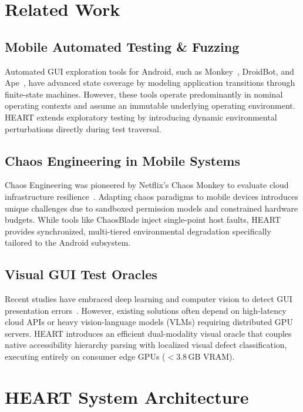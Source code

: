 \documentclass[conference]{IEEEtran}
\begin{document}
\section{Related Work}

\subsection{Mobile Automated Testing \& Fuzzing}
Automated GUI exploration tools for Android, such as Monkey~\cite{choudhary2015automated}, DroidBot, and Ape~\cite{su2017guided}, have advanced state coverage by modeling application transitions through finite-state machines. However, these tools operate predominantly in nominal operating contexts and assume an immutable underlying operating environment. HEART extends exploratory testing by introducing dynamic environmental perturbations directly during test traversal.

\subsection{Chaos Engineering in Mobile Systems}
Chaos Engineering was pioneered by Netflix's Chaos Monkey to evaluate cloud infrastructure resilience~\cite{basiri2016chaos}. Adapting chaos paradigms to mobile devices introduces unique challenges due to sandboxed permission models and constrained hardware budgets. While tools like ChaosBlade inject single-point host faults, HEART provides synchronized, multi-tiered environmental degradation specifically tailored to the Android subsystem.

\subsection{Visual GUI Test Oracles}
Recent studies have embraced deep learning and computer vision to detect GUI presentation errors~\cite{zheng2019automated,chen2020object}. However, existing solutions often depend on high-latency cloud APIs or heavy vision-language models (VLMs) requiring distributed GPU servers. HEART introduces an efficient dual-modality visual oracle that couples native accessibility hierarchy parsing with localized visual defect classification, executing entirely on consumer edge GPUs ($<$3.8\,GB VRAM).

\section{HEART System Architecture}
\end{document}

